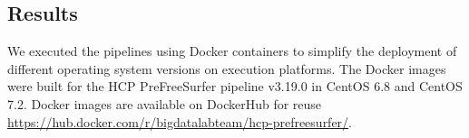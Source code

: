 \documentclass[a4paper,num-refs]{oup-contemporary}
\begin{document}


%



\subsection{Results}

We executed the pipelines using Docker containers to simplify the 
deployment of different operating system versions on execution 
platforms. The Docker images were built for the HCP PreFreeSurfer 
pipeline v3.19.0 in 
CentOS 6.8 and CentOS 7.2. Docker images are available on DockerHub for 
reuse \url{https://hub.docker.com/r/bigdatalabteam/hcp-prefreesurfer/}. 
\end{document}
